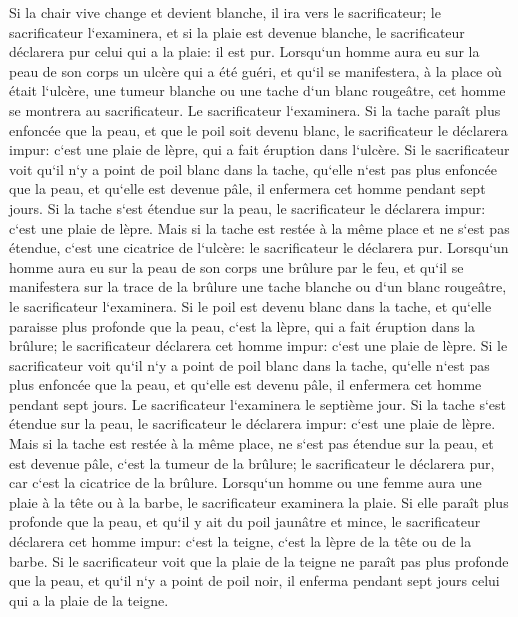 \verse Si la chair vive change et devient blanche, il ira vers le sacrificateur; 
\verse le sacrificateur l`examinera, et si la plaie est devenue blanche, le sacrificateur déclarera pur celui qui a la plaie: il est pur. 
\verse Lorsqu`un homme aura eu sur la peau de son corps un ulcère qui a été guéri, 
\verse et qu`il se manifestera, à la place où était l`ulcère, une tumeur blanche ou une tache d`un blanc rougeâtre, cet homme se montrera au sacrificateur. 
\verse Le sacrificateur l`examinera. Si la tache paraît plus enfoncée que la peau, et que le poil soit devenu blanc, le sacrificateur le déclarera impur: c`est une plaie de lèpre, qui a fait éruption dans l`ulcère. 
\verse Si le sacrificateur voit qu`il n`y a point de poil blanc dans la tache, qu`elle n`est pas plus enfoncée que la peau, et qu`elle est devenue pâle, il enfermera cet homme pendant sept jours. 
\verse Si la tache s`est étendue sur la peau, le sacrificateur le déclarera impur: c`est une plaie de lèpre. 
\verse Mais si la tache est restée à la même place et ne s`est pas étendue, c`est une cicatrice de l`ulcère: le sacrificateur le déclarera pur. 
\verse Lorsqu`un homme aura eu sur la peau de son corps une brûlure par le feu, et qu`il se manifestera sur la trace de la brûlure une tache blanche ou d`un blanc rougeâtre, le sacrificateur l`examinera. 
\verse Si le poil est devenu blanc dans la tache, et qu`elle paraisse plus profonde que la peau, c`est la lèpre, qui a fait éruption dans la brûlure; le sacrificateur déclarera cet homme impur: c`est une plaie de lèpre. 
\verse Si le sacrificateur voit qu`il n`y a point de poil blanc dans la tache, qu`elle n`est pas plus enfoncée que la peau, et qu`elle est devenu pâle, il enfermera cet homme pendant sept jours. 
\verse Le sacrificateur l`examinera le septième jour. Si la tache s`est étendue sur la peau, le sacrificateur le déclarera impur: c`est une plaie de lèpre. 
\verse Mais si la tache est restée à la même place, ne s`est pas étendue sur la peau, et est devenue pâle, c`est la tumeur de la brûlure; le sacrificateur le déclarera pur, car c`est la cicatrice de la brûlure. 
\verse Lorsqu`un homme ou une femme aura une plaie à la tête ou à la barbe, 
\verse le sacrificateur examinera la plaie. Si elle paraît plus profonde que la peau, et qu`il y ait du poil jaunâtre et mince, le sacrificateur déclarera cet homme impur: c`est la teigne, c`est la lèpre de la tête ou de la barbe. 
\verse Si le sacrificateur voit que la plaie de la teigne ne paraît pas plus profonde que la peau, et qu`il n`y a point de poil noir, il enferma pendant sept jours celui qui a la plaie de la teigne. 
